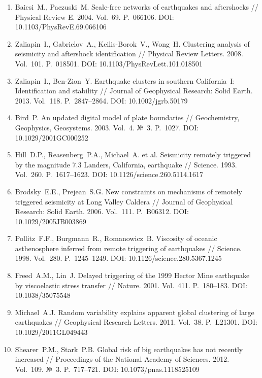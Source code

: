 \documentclass[12pt,a4paper]{article}
\begin{document}
\begin{enumerate}[leftmargin=*,label=\arabic*.]

\item Baiesi~M., Paczuski~M. Scale-free networks of earthquakes and aftershocks
// Physical Review E. 2004. Vol.~69. P.~066106.
DOI: 10.1103/PhysRevE.69.066106

\item Zaliapin~I., Gabrielov~A., Keilis-Borok~V., Wong~H. Clustering analysis of
seismicity and aftershock identification
// Physical Review Letters. 2008. Vol.~101. P.~018501.
DOI: 10.1103/PhysRevLett.101.018501

\item Zaliapin~I., Ben-Zion~Y. Earthquake clusters in southern California~I:
Identification and stability
// Journal of Geophysical Research: Solid Earth. 2013. Vol.~118. P.~2847--2864.
DOI: 10.1002/jgrb.50179

\item Bird~P. An updated digital model of plate boundaries
// Geochemistry, Geophysics, Geosystems. 2003. Vol.~4. №~3. P.~1027.
DOI: 10.1029/2001GC000252

\item Hill~D.P., Reasenberg~P.A., Michael~A. et al. Seismicity remotely triggered
by the magnitude 7.3 Landers, California, earthquake
// Science. 1993. Vol.~260. P.~1617--1623.
DOI: 10.1126/science.260.5114.1617

\item Brodsky~E.E., Prejean~S.G. New constraints on mechanisms of remotely triggered
seismicity at Long Valley Caldera
// Journal of Geophysical Research: Solid Earth. 2006. Vol.~111. P.~B06312.
DOI: 10.1029/2005JB003869

\item Pollitz~F.F., Burgmann~R., Romanowicz~B. Viscosity of oceanic asthenosphere
inferred from remote triggering of earthquakes
// Science. 1998. Vol.~280. P.~1245--1249.
DOI: 10.1126/science.280.5367.1245

\item Freed~A.M., Lin~J. Delayed triggering of the 1999 Hector Mine earthquake
by viscoelastic stress transfer
// Nature. 2001. Vol.~411. P.~180--183.
DOI: 10.1038/35075548

\item Michael~A.J. Random variability explains apparent global clustering of
large earthquakes
// Geophysical Research Letters. 2011. Vol.~38. P.~L21301.
DOI: 10.1029/2011GL049443

\item Shearer~P.M., Stark~P.B. Global risk of big earthquakes has not recently
increased
// Proceedings of the National Academy of Sciences. 2012. Vol.~109. №~3.
P.~717--721. DOI: 10.1073/pnas.1118525109


\end{enumerate}
\end{document}
